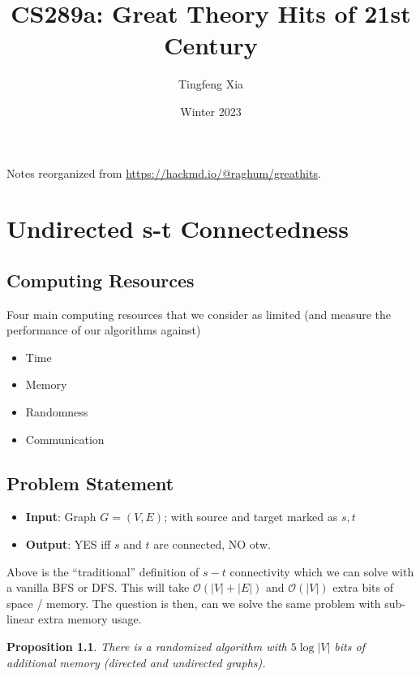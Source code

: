 \documentclass[11pt]{book}
\author{Tingfeng Xia}
\title{CS289a: Great Theory Hits of 21st Century}
\date{Winter 2023}
\newtheorem{proposition}{Proposition}[chapter]
\begin{document}
\maketitle

\vspace*{\fill}
Notes reorganized from \url{https://hackmd.io/@raghum/greathits}.\newline \newline 
\doclicenseThis

\tableofcontents

\chapter{Undirected s-t Connectedness}

\section{Computing Resources}
Four main computing resources that we consider as limited (and measure the performance of our algorithms against)
\begin{itemize}
	\item Time 
	\item Memory
	\item Randomness
	\item Communication
\end{itemize}

\section{Problem Statement}

\begin{itemize}
	\item \textbf{Input}: Graph $G = (V, E)$; with source and target marked as $s, t$
	\item \textbf{Output}: YES iff $s$ and $t$ are connected, NO otw.
\end{itemize}

Above is the ``traditional'' definition of $s-t$ connectivity which we can solve with a vanilla BFS or DFS. This will take $\mathcal O ( |V| + |E| ) $ and $\mathcal O (|V| )$ extra bits of space / memory. The question is then, can we solve the same problem with sub-linear extra memory usage. 

\begin{proposition}
	There is a randomized algorithm with $5 \log |V|$ bits of additional memory (directed and undirected graphs). 
\end{proposition}
\end{document}
